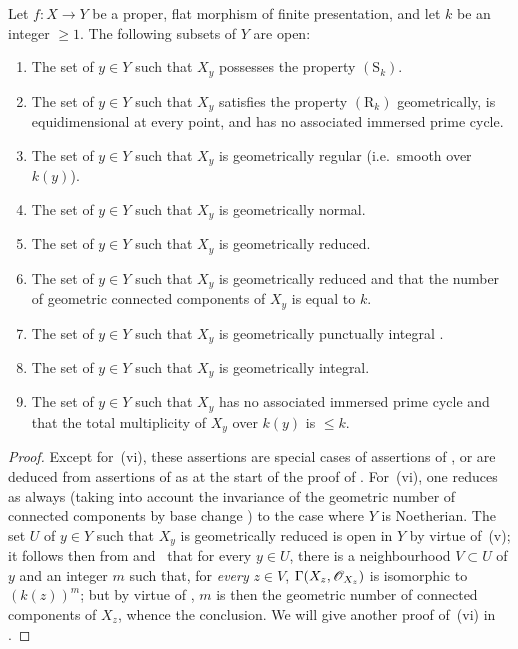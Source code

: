 \begin{theorem}[12.2.4]
\label{IV.12.2.4}
Let $f:X\to Y$ be a proper, flat morphism of finite presentation, and let $k$ be an integer $\geqslant 1$.
The following subsets of $Y$ are open:
\begin{enumerate}[label=(\roman*)]
  \item The set of $y\in Y$ such that $X_y$ possesses the property $(\mathrm{S}_k)$.
  \item The set of $y\in Y$ such that $X_y$ satisfies the property $(\mathrm{R}_k)$ geometrically, is equidimensional at every point, and has no associated immersed prime cycle.
  \item The set of $y\in Y$ such that $X_y$ is geometrically regular (i.e.\ smooth over $k(y)$).
  \item The set of $y\in Y$ such that $X_y$ is geometrically normal.
  \item The set of $y\in Y$ such that $X_y$ is geometrically reduced.
  \item The set of $y\in Y$ such that $X_y$ is geometrically reduced and that the number of geometric connected components of $X_y$ is equal to $k$.
  \item The set of $y\in Y$ such that $X_y$ is geometrically punctually integral .
  \item The set of $y\in Y$ such that $X_y$ is geometrically integral.
  \item The set of $y\in Y$ such that $X_y$ has no associated immersed prime cycle and that the total multiplicity  of $X_y$ over $k(y)$ is $\leqslant k$.
\end{enumerate}
\end{theorem}

\begin{proof}
Except for~(vi), these assertions are special cases of assertions of , or are deduced from assertions of  as at the start of the proof of .
For~(vi), one reduces as always (taking into account the invariance of the geometric number of connected components by base change ) to the case where $Y$ is Noetherian.
The set $U$ of $y\in Y$ such that $X_y$ is geometrically reduced is open in $Y$ by virtue of~(v); it follows then from  and~ that for every $y\in U$, there is a neighbourhood $V\subset U$ of $y$ and an integer $m$ such that, for \emph{every} $z\in V$, $\Gamma(X_z,\mathscr{O}_{X_z})$ is isomorphic to $(k(z))^m$; but by virtue of , $m$ is then the geometric number of connected components of $X_z$, whence the conclusion.
We will give another proof of~(vi) in .
\end{proof}


